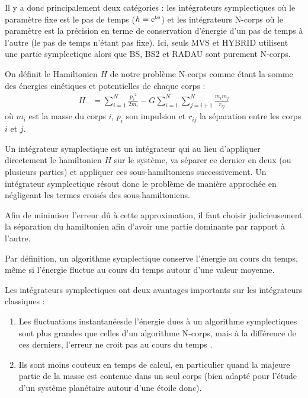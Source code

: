 Il y a donc principalement deux catégories : les intégrateurs symplectiques où le paramètre fixe est le pas de temps ($h=\mathrm{c^{te}}$) et les intégrateurs N-corps où le paramètre est la précision en terme de conservation d'énergie d'un pas de temps à l'autre (le pas de temps n'étant pas fixe). Ici, seuls MVS et HYBRID utilisent une partie symplectique alors que BS, BS2 et RADAU sont purement N-corps.

\bigskip

On définit le Hamiltonien $H$ de notre problème N-corps comme étant la somme des énergies cinétiques et potentielles de chaque corps : 
\begin{align}
H &= \sum_{i=1}^N\frac{{p_i}^2}{2m_i} -G\sum_{i=1}^N\sum_{j=i+1}^N\frac{m_im_j}{r_{ij}}
\end{align}
où $m_i$ est la masse du corps $i$, $p_i$ son impulsion et $r_{ij}$ la séparation entre les corps $i$ et $j$.

Un intégrateur symplectique est un intégrateur qui au lieu d'appliquer directement le hamiltonien $H$ sur le système, va séparer ce dernier en deux (ou plusieurs parties) et appliquer ces sous-hamiltoniens successivement. Un intégrateur symplectique résout donc le problème de manière approchée en négligeant les termes croisés des sous-hamiltoniens.

Afin de minimiser l'erreur dû à cette approximation, il faut choisir judicieusement la séparation du hamiltonien afin d'avoir une partie dominante par rapport à l'autre.

Par définition, un algorithme symplectique conserve l'énergie au cours du temps, même si l'énergie fluctue au cours du temps autour d'une valeur moyenne. 

Les intégrateurs symplectiques ont deux avantages importants sur les intégrateurs classiques : 
\begin{enumerate}
\item Les fluctuations \og instantanées\fg de l'énergie dues à un algorithme symplectiques sont plus grandes que celles d'un algorithme N-corps, mais à la différence de ces derniers, l'erreur ne croit pas au cours du temps .
\item Ils sont moins couteux en temps de calcul, en particulier quand la majeure partie de la masse est contenue dans un seul corps (bien adapté pour l'étude d'un système planétaire autour d'une étoile donc).
\end{enumerate}


